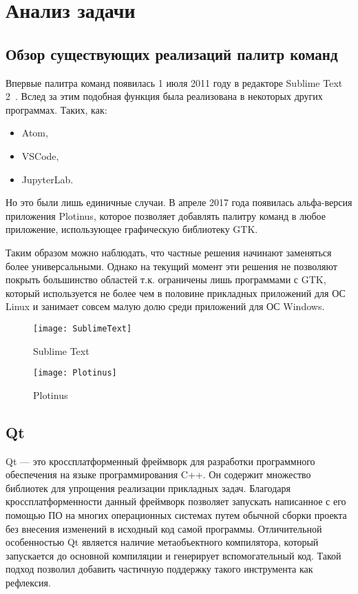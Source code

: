 \chapter{Анализ задачи}

\section{Обзор существующих реализаций палитр команд}\label{analogs}

Впервые палитра команд появилась 1 июля 2011 году в редакторе Sublime Text
2~\cite{sublimetext2changelog}. Вслед за этим подобная функция была реализована
в некоторых других программах. Таких, как:
\begin{itemize}
	\item Atom\cite{atom},
	\item VSCode\cite{vscode},
	\item JupyterLab\cite{jupyterlab}.
\end{itemize}

Но это были лишь единичные случаи. В апреле 2017 года появилась альфа-версия
приложения Plotinus\cite{plotinus}, которое позволяет добавлять палитру команд в
любое приложение, использующее графическую библиотеку GTK.

Таким образом можно наблюдать, что частные решения начинают заменяться более
универсальными. Однако на текущий момент эти решения не позволяют покрыть
большинство областей т.к. ограничены лишь программами с GTK, который
используется не более чем в половине прикладных приложений для ОС Linux и
занимает совсем малую долю среди приложений для ОС Windows.

\begin{figure}[h]
	\centering
	\texttt{[image: SublimeText]}
	\label{sublimetext}
	\caption{Sublime Text}
\end{figure}

\begin{figure}[h]
	\centering
	\texttt{[image: Plotinus]}
	\caption{Plotinus}
\end{figure}

\section{Qt}

Qt — это кроссплатформенный фреймворк для разработки программного обеспечения
на языке программирования C++\cite{qtabout}. Он содержит множество библиотек для
упрощения реализации прикладных задач. Благодаря кроссплатформенности данный
фреймворк позволяет запускать написанное с его помощью ПО на многих операционных
системах путем обычной сборки проекта без внесения изменений в исходный код
самой программы. Отличительной особенностью Qt является наличие метаобъектного
компилятора, который запускается до основной компиляции и генерирует
вспомогательный код. Такой подход позволил добавить частичную поддержку такого
инструмента как рефлексия.

